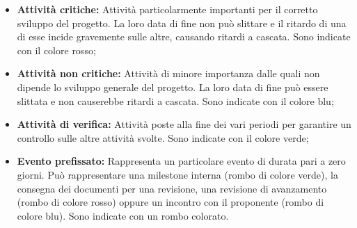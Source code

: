 \begin{itemize}
    \item \textbf{Attività critiche:} Attività particolarmente importanti per il corretto sviluppo del progetto. La loro data di fine non può slittare e il ritardo di una di esse
    incide gravemente sulle altre, causando ritardi a cascata. Sono indicate con il colore rosso;
    \item \textbf{Attività non critiche:} Attività di minore importanza dalle quali non dipende lo sviluppo generale del progetto. La loro data di fine può essere slittata e non causerebbe ritardi a cascata.
    Sono indicate con il colore blu;
    \item \textbf{Attività di verifica:} Attività poste alla fine dei vari periodi per garantire un controllo sulle altre attività svolte.
    Sono indicate con il colore verde;
    \item \textbf{Evento prefissato:} Rappresenta un particolare evento di durata pari a zero giorni. Può rappresentare una milestone\glo{} interna (rombo di colore verde), la consegna dei documenti
    per una revisione, una revisione di avanzamento (rombo di colore rosso) oppure un incontro con il
    proponente (rombo di colore blu). Sono indicate con un rombo colorato.
  \end{itemize}


